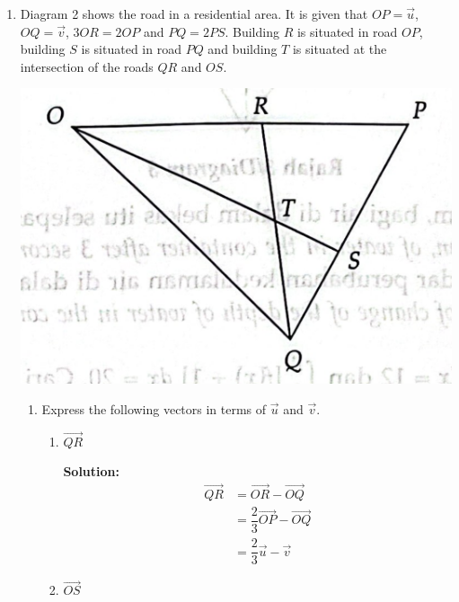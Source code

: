 \documentclass{report}
\newcommand{\sol}{\textbf{Solution:}}
\begin{document}
\begin{enumerate}[leftmargin=*]
          \newpage
    \item Diagram 2 shows the road in a residential area. It is given that $OP =
              \vec{u}$, $OQ = \vec{v}$, $3OR = 2OP$ and $PQ = 2PS$. Building $R$ is situated
          in road $OP$, building $S$ is situated in road $PQ$ and building $T$ is
          situated at the intersection of the roads $QR$ and $OS$.
          \begin{center}
              \includegraphics[scale=0.2]{assets/13.png}
          \end{center}

          \begin{enumerate}
              \item Express the following vectors in terms of $\vec{u}$ and $\vec{v}$.

                    \begin{enumerate}
                        \item $\overrightarrow{QR}$

                              \sol{}
                              \begin{align*}
                                  \overrightarrow{QR} & = \overrightarrow{OR} - \overrightarrow{OQ}             \\
                                                      & = \dfrac{2}{3}\overrightarrow{OP} - \overrightarrow{OQ} \\
                                                      & = \dfrac{2}{3}\vec{u} - \vec{v}
                              \end{align*}

                        \item $\overrightarrow{OS}$


\end{enumerate}
\end{enumerate}
\end{enumerate}
\end{document}
